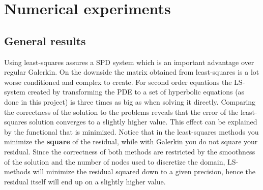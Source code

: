 
\chapter{Numerical experiments} %

\label{chap:results} %


\section{General results}
Using least-squares assures a SPD system which is an important advantage over regular Galerkin. On the downside the matrix obtained from least-squares is a lot worse conditioned and complex to create. For second order equations the LS-system created by transforming the PDE to a set of hyperbolic equations (as done in this project) is three times as big as when solving it directly. Comparing the correctness of the solution to the problems
reveals that the error of the least-squares solution converges to a slightly higher value. This effect can be explained by the functional that is minimized. Notice that in the least-squares methods you minimize the \textbf{square} of the residual, while with Galerkin you do not square your residual. Since the correctness of both methods are restricted by the smoothness of the solution and the number of nodes used to discretize the domain, LS-methods will minimize the residual squared down to a given precision, hence the residual itself will end up on a slightly higher value. 
%
